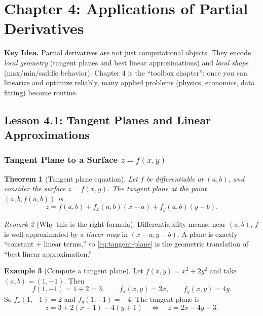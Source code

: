 \documentclass[12pt]{article}
\numberwithin{equation}{section}
\theoremstyle{plain}
\newtheorem{theorem}{Theorem}[section]
\theoremstyle{definition}
\newtheorem{example}[theorem]{Example}
\theoremstyle{remark}
\newtheorem{remark}[theorem]{Remark}
\newenvironment{keyidea}{\begin{tcolorbox}\textbf{Key Idea.}}{\end{tcolorbox}}
\begin{document}


\section{Chapter 4: Applications of Partial Derivatives}

\begin{keyidea}
Partial derivatives are not just computational objects. They encode \emph{local geometry} (tangent planes and best linear approximations) and \emph{local shape} (max/min/saddle behavior).  
Chapter 4 is the ``toolbox chapter'': once you can linearize and optimize reliably, many applied problems (physics, economics, data fitting) become routine.
\end{keyidea}

\subsection{Lesson 4.1: Tangent Planes and Linear Approximations}

\subsubsection{Tangent Plane to a Surface $z=f(x,y)$}

\begin{theorem}[Tangent plane equation]\label{thm:tangent-plane}
Let $f$ be differentiable at $(a,b)$, and consider the surface $z=f(x,y)$.  
The tangent plane at the point $(a,b,f(a,b))$ is
\begin{equation}\label{eq:tangent-plane}
z = f(a,b) + f_x(a,b)(x-a) + f_y(a,b)(y-b).
\end{equation}
\end{theorem}

\begin{remark}[Why this is the right formula]
Differentiability means: near $(a,b)$, $f$ is well-approximated by a \emph{linear map} in $(x-a,y-b)$.  
A plane is exactly “constant + linear terms,” so \cref{eq:tangent-plane} is the geometric translation of “best linear approximation.”
\end{remark}

\begin{example}[Compute a tangent plane]
Let $f(x,y)=x^2+2y^2$ and take $(a,b)=(1,-1)$. Then
\[
f(1,-1)=1+2=3,\qquad f_x(x,y)=2x,\qquad f_y(x,y)=4y.
\]
So $f_x(1,-1)=2$ and $f_y(1,-1)=-4$. The tangent plane is
\[
z = 3 + 2(x-1) - 4(y+1)
\quad\Longleftrightarrow\quad
z = 2x - 4y - 3.
\]
\end{example}
\end{document}

